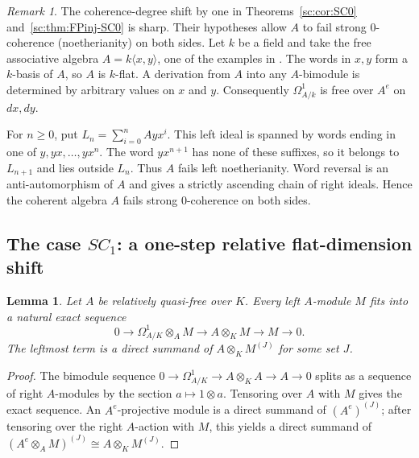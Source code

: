 \documentclass[11pt]{article}
\numberwithin{equation}{section}
\newtheorem{lemma}[theorem]{Lemma}
\theoremstyle{definition}
\theoremstyle{remark}
\newtheorem{remark}[theorem]{Remark}
\begin{document}
\begin{remark}\label{sc:rem:sharp-SC0}
The coherence-degree shift by one in
Theorems~\ref{sc:cor:SC0} and~\ref{sc:thm:FPinj-SC0} is sharp.
Their hypotheses allow $A$ to fail strong $0$-coherence
(noetherianity) on both sides.
Let $k$ be a field and take the free associative algebra
$A=k\langle x,y\rangle$, one of the examples in
\cite[Section~4]{BondalZhdanovskiy}.  The words in $x,y$ form a
$k$-basis of $A$, so $A$ is $k$-flat.  A derivation from $A$ into any
$A$-bimodule is determined by arbitrary values on $x$ and $y$.
Consequently $\Omega^1_{A/k}$ is free over $A^e$ on $dx,dy$.

For $n\ge0$, put $L_n=\sum_{i=0}^n A yx^i$.  This left ideal is
spanned by words ending in one of $y,yx,\ldots,yx^n$.  The word
$yx^{n+1}$ has none of these suffixes, so it belongs to $L_{n+1}$
and lies outside $L_n$.  Thus $A$ fails left noetherianity.
Word reversal is an anti-automorphism of $A$ and gives a strictly
ascending chain of right ideals.  Hence the coherent algebra $A$
fails strong $0$-coherence on both sides.
\end{remark}

\subsection{The case \texorpdfstring{$SC_1$}{SC1}: a one-step relative flat-dimension shift}

\begin{lemma}\label{sc:lem:relative-resolution}
Let $A$ be relatively quasi-free over $K$.  Every left $A$-module $M$
fits into a natural exact sequence
\[
0\longrightarrow\Omega^1_{A/K}\otimes_A M
\longrightarrow A\otimes_KM\longrightarrow M\longrightarrow0.
\]
The leftmost term is a direct summand of $A\otimes_KM^{(J)}$ for some set
$J$.
\end{lemma}
\begin{proof}
The bimodule sequence
$0\to\Omega^1_{A/K}\to A\otimes_KA\to A\to0$ splits as a sequence of
right $A$-modules by the section $a\mapsto1\otimes a$.
Tensoring over $A$ with $M$ gives the exact sequence.  An $A^e$-projective
module is a direct summand of $(A^e)^{(J)}$; after tensoring over the
right $A$-action with $M$, this yields a direct summand of
$(A^e\otimes_AM)^{(J)}\cong A\otimes_KM^{(J)}$.
\end{proof}
\end{document}
